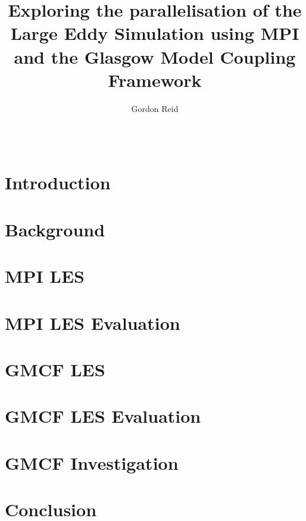 \documentclass{acm_proc_article-sp}
\title{Exploring the parallelisation of the Large Eddy Simulation using MPI and
the Glasgow Model Coupling Framework}
\author{
    \alignauthor
    Gordon Reid\\
    \affaddr{School of Computing Science}\\
    \affaddr{University of Glasgow}\\
    \email{1002536r@student.gla.ac.uk}
}
\begin{document}
\maketitle

\begin{abstract}

\end{abstract}

\section{Introduction}


\section{Background}
\label{sec:Background}


\section{MPI LES}
\label{sec:MPILES}


\section{MPI LES Evaluation}
\label{sec:MPILESEval}


\section{GMCF LES}
\label{sec:GMCFLES}


\section{GMCF LES Evaluation}
\label{sec:GMCFLESEval}


\section{GMCF Investigation}
\label{sec:GMCFInvestigation}


\section{Conclusion}
\label{sec:Conclusion}




\end{document}
